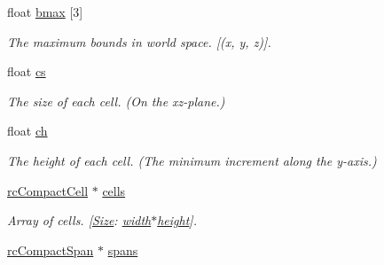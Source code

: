 \begin{DoxyCompactItemize}
\mbox{\label{structrcCompactHeightfield_a67b37c36645a77ac03b00f514b73b09d}} 
float \hyperlink{structrcCompactHeightfield_a67b37c36645a77ac03b00f514b73b09d}{bmax} \mbox{[}3\mbox{]}
\begin{DoxyCompactList}\small\item\em The maximum bounds in world space. \mbox{[}(x, y, z)\mbox{]}. \end{DoxyCompactList}\item 
\mbox{\label{structrcCompactHeightfield_a75ee8e198d672db29a2f98c7463c0b31}} 
float \hyperlink{structrcCompactHeightfield_a75ee8e198d672db29a2f98c7463c0b31}{cs}
\begin{DoxyCompactList}\small\item\em The size of each cell. (On the xz-\/plane.) \end{DoxyCompactList}\item 
\mbox{\label{structrcCompactHeightfield_a39baf56bf3baf2b026aae0a309facaf4}} 
float \hyperlink{structrcCompactHeightfield_a39baf56bf3baf2b026aae0a309facaf4}{ch}
\begin{DoxyCompactList}\small\item\em The height of each cell. (The minimum increment along the y-\/axis.) \end{DoxyCompactList}\item 
\mbox{\label{structrcCompactHeightfield_ac89b43c4e98838d7d5f58beb73e03078}} 
\hyperlink{structrcCompactCell}{rc\+Compact\+Cell} $\ast$ \hyperlink{structrcCompactHeightfield_ac89b43c4e98838d7d5f58beb73e03078}{cells}
\begin{DoxyCompactList}\small\item\em Array of cells. \mbox{[}\hyperlink{classSize}{Size}\+: \hyperlink{structrcCompactHeightfield_a98868c1df2523cd724696ed1d223ba13}{width}$\ast$\hyperlink{structrcCompactHeightfield_a25d9e16e5d82cf698e47b18a5740b639}{height}\mbox{]}. \end{DoxyCompactList}\item 
\mbox{\label{structrcCompactHeightfield_a651c7be6fc00589f5487778dea1e527b}} 
\hyperlink{structrcCompactSpan}{rc\+Compact\+Span} $\ast$ \hyperlink{structrcCompactHeightfield_a651c7be6fc00589f5487778dea1e527b}{spans}

\end{DoxyCompactItemize}

